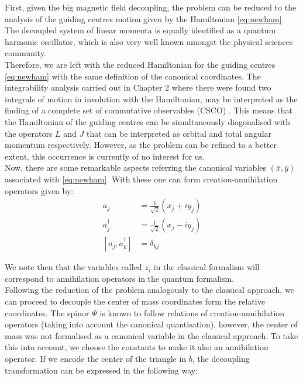 First, given the big magnetic field decoupling, the problem can be reduced to the analysis of the guiding centres motion given by the Hamiltonian \eqref{eq:newham}. The decoupled system of linear momenta is equally identified as a quantum harmonic oscillator, which is also very well known amongst the physical sciences community.\\


Therefore, we are left with the reduced Hamiltonian for the guiding centres \eqref{eq:newham} with the same definition of the canonical coordinates. The integrability analysis carried out in Chapter 2 where there were found two integrals of motion in involution with the Hamiltonian, may be interpreted as the finding of a complete set of commutative observables (CSCO) \cite{csco}. This means that the Hamiltonian of the guiding centres can be simultaneously diagonalised with the operators $L$ and $J$ that can be interpreted as orbital and total angular momentum respectively. However, as the problem can be refined to a better extent, this occurrence is currently of no interest for us.\\

Now, there are some remarkable aspects referring the canonical variables $(\bar{x},\bar{y})$ associated with \eqref{eq:newham}. With these one can form creation-annihilation operators given by:\\

\begin{align*}
a_j &= \frac{1}{\sqrt{2}}(x_j+iy_j)\\
a_j^\dagger &= \frac{1}{\sqrt{2}}(x_j-iy_j)\\
\left[a_j,a_k^\dagger\right] &= \delta_{kj}
\end{align*}

We note then that the variables called $z_i$ in the classical formalism will correspond to annihilation operators in the quantum formalism.\\

Following the reduction of the problem analogously to the classical approach, we can proceed to decouple the center of mass coordinates form the relative coordinates. The spinor $\Psi$ is known to follow relations of creation-annihilation operators (taking into account the canonical quantisation), however, the center of mass was not formalised as a canonical variable in the classical approach. To take this into account, we choose the constants to make it also an annihilation operator. If we encode the center of the triangle in $b$, the decoupling transformation can be expressed in the following way:\\


